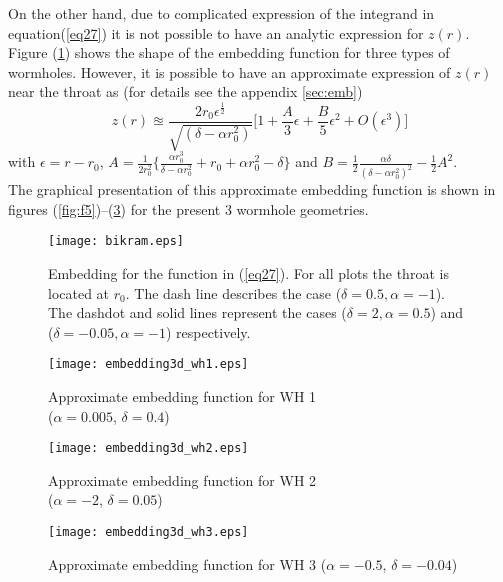 \documentclass[10pt]{revtex4}
\begin{document}
\par
On the other hand, due to complicated expression of the integrand in equation(\ref{eq27}) it is not possible to have an analytic expression for $z(r)$. Figure (\ref{fig:f4}) shows the shape of the embedding function for three types of wormholes. However, it is possible to have an approximate expression of $z(r)$ near the throat as (for details see the appendix \ref{sec:emb})
\begin{equation}\label{eq29.1}
z(r)\approxeq\frac{2r_0\epsilon^{\frac{1}{2}}}{\sqrt{(\delta-\alpha r_0^2)}}\Bigg[1+\frac{A}{3}\epsilon+\frac{B}{5}\epsilon^2+O(\epsilon^3)\Bigg]
\end{equation}
with $\epsilon=r-r_0$, $A=\frac{1}{2r_0^2}\Biggl\{\frac{\alpha r_0^3}{\delta-\alpha r_0^2}+r_0+\alpha r_0^2-\delta\Biggr\}$ and $B=\frac{1}{2}\frac{\alpha\delta}{(\delta-\alpha r_0^2)^2}-\frac{1}{2}A^2$.\\
The graphical presentation of this approximate embedding function is shown in figures (\ref{fig:f5})--(\ref{fig:f7}) for the present 3 wormhole geometries.
 \begin{figure}[!htb]
 \texttt{[image: bikram.eps]}
 \caption{ Embedding for the function in (\ref{eq27}). For all plots the throat is located at $r_0$. The dash line describes the case ($\delta=0.5, \alpha=-1$). The dashdot and solid lines represent the cases ($\delta=2, \alpha=0.5$) and ($\delta=-0.05, \alpha=-1$) respectively.}
 \label{fig:f4}
 \end{figure}
 \begin{figure}[!htb]
 	\centering
 	\begin{minipage}{.5\textwidth}
 		\centering
 		\texttt{[image: embedding3d\_wh1.eps]}
 		\caption{Approximate embedding function for WH 1\\
 			 ($\alpha=0.005$, $\delta=0.4$) }
 		\label{fig:f5}
 	\end{minipage}%
 	\begin{minipage}{.5\textwidth}
 		\centering
 		\texttt{[image: embedding3d\_wh2.eps]}
 		\caption{ Approximate embedding function for WH 2\\ ($\alpha=-2$, $\delta=0.05$) }
 		\label{fig:f6}
 	\end{minipage}
 \end{figure}
 \begin{figure}[!htb]
 	\texttt{[image: embedding3d\_wh3.eps]}
 	\caption{ Approximate embedding function for WH 3 ($\alpha=-0.5$, $\delta=-0.04$) }
 	\label{fig:f7}
 \end{figure}\\
\par 
\end{document}
